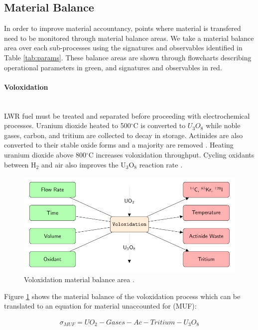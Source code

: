 \subsection{Material Balance}
In order to improve material accountancy, points where material is transfered need to be monitored through material balance areas.
We take a material balance area over each sub-processes using the signatures and observables identified in Table \ref{tab:params}. 
These balance areas are shown through flowcharts describing operational parameters in green, and signatures and observables in red. 

\paragraph{Voloxidation} \mbox{}\\
\gls{LWR} fuel must be treated and separated before proceeding with electrochemical processes. Uranium dioxide heated to 
500$^{\circ}$C is converted to $U_3O_8$ while noble gases, carbon, and tritium are collected to decay in storage. 
Actinides are also converted to their stable oxide forms and a majority are removed \cite{flowsheet_1998,jubin_spent_2009}. 
Heating uranium dioxide above 800$^{\circ}$C increases voloxidation throughput.
Cycling oxidants between H$_2$ and air also improves the U$_3$O$_8$ reaction rate \cite{jubin_spent_2009}.

\begin{figure}[h]
	\centering
	\includegraphics[width=0.9\linewidth]{images/volox}
	\caption{Voloxidation material balance area \cite{jubin_spent_2009}.}
	\label{fig:volox}
\end{figure}

Figure \ref{fig:volox} shows the material balance of the voloxidation process which can be translated to an equation for material unaccounted for (MUF):

\begin{align}
\sigma_{MUF} = UO_2 - Gases - Ac - Tritium - U_3O_8
\end{align}

